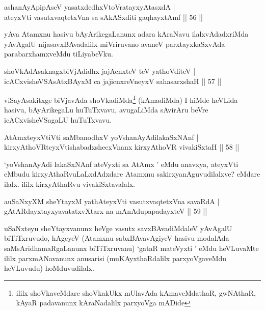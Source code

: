 \begin{shl}
ashanAyApipAseV yasatxdedhxVtoVratayxyAtasxdA |\\
ateyxVti vasutxvaqtetxVna sa sAkASxditi gaqhayxtAmf \hfill || 56 ||
\end{shl}

\begin{artha}
yAva Atamxnu hasivu bAyArikegaLanunx adara kAraNavu ilalxvAdadxriMda yAvAgalU nijasavxBAvadalilx miVriruvano avaneV parxtayxkaSxvAda parabarxhamxveMdu tiLiyabeVku.
\end{artha}

\begin{shl}
shoVkAdAsaknagxbiVjAdidhx jajAcnxteV teV yathoVditeV |\\
icACxvisheVSAsAtxBAyxM ca jajicnxreV\s neyxV sahasarxshaH \hfill || 57 ||
\end{shl}

\begin{artha}
viSayAsakitxge biVjavAda shoVkadiMda\footnote{ililx shoVkaveMdare shoVkakUkx mUlavAda kAmaveMdathaR, gwNAthaR, kAyaR padavanunx kAraNadalilx parxyoVga mADide} (kAmadiMda) I hiMde heVLida hasivu, bAyArikegaLu huTuTxvavu, avugaLiMda sAvirAru beVre icACxvisheVSagaLU huTuTxvavu.
\end{artha}


\begin{shl}
AtAmx\s teyxVtiVti saMbanodhxV yoV\s shanAyAdilakaSxNAnf |\\
kirxyAthoVR\s teyxVtishabadxshecxVnanx kirxyAthoVR vivakiSxtaH \hfill || 58 ||
\end{shl}

\begin{artha}
`yoV\s shanAyAdi lakaSxNAnf ateVyxti sa AtAmx ' eMdu anavxya, ateyxVti eMbudu kirxyAthaRvuLaLxdAdxdare Atamxnu sakirxyanAguvudilalxve? eMdare ilalx. ililx kirxyAthaRvu vivakiSxtavalalx. 
\end{artha}


\begin{shl}
auSaNxyXM sheYtayxM yathA\s teyxVti vasutxvaqtetxVna savaRdA |\\
gAtARdayxtayxyavatatxvXtarx na mAnAdupapadayxteV \hfill || 59 ||
\end{shl}

\begin{artha}
uSaNxteyu sheYtayxvanunx heVge vasutx savxBAvadiMdaleV yAvAgalU biTiTxruvudo, hAgeyeV (Atamxnu sabxBAvavAgiyeV hasivu modalAda saMsAridhamaRgaLanunx biTiTxruvanu) `gataR mateVyxti ' eMdu heVLuvaMte ililx parxmANavanunx anusarisi  (muKAyxthaRdalilx parxyoVgaveMdu heVLuvudu) hoMduvudilalx. 
\end{artha}

